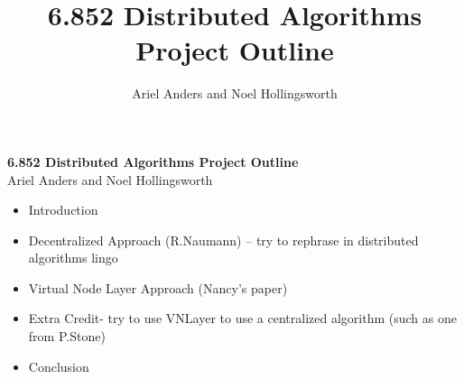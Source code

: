 \documentclass[12pt]{article}
\title{6.852 Distributed Algorithms Project Outline}
\author{Ariel Anders and Noel Hollingsworth}
\begin{document}
\begin{center}{\bf \Large
6.852 Distributed Algorithms Project Outline\\ }
Ariel Anders and Noel Hollingsworth 
\end{center}

\begin{itemize}
\item Introduction
\item Decentralized Approach (R.Naumann) -- try to rephrase in distributed algorithms lingo
\item Virtual Node Layer Approach (Nancy's paper)
\item Extra Credit- try to use VNLayer to use a centralized algorithm (such as one from P.Stone)
\item Conclusion
\end{itemize}
\end{document}
